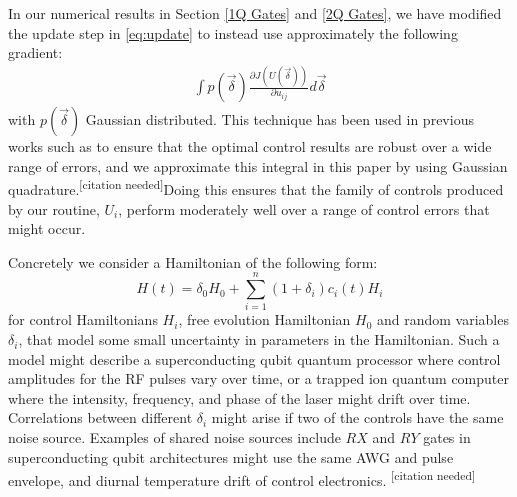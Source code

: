\documentclass[aps,nofootinbib,pra,notitlepage,twocolumn]{revtex4-1}
\newcommand{\needcite}{{\color{blue}\textsuperscript{[citation needed]}}}
\begin{document}
In our numerical results in Section \ref{1Q Gates} and \ref{2Q Gates}, we have modified the update step in \ref{eq:update} to instead use approximately the following gradient:
\begin{align}\label{quadrature}
\int p(\vec{\delta})\frac{\partial J(U(\vec{\delta}))}{\partial u_{ij}} d\vec{\delta}
\end{align}
with $p(\vec{\delta})$ Gaussian distributed. This technique has been used in previous works such as \cite{Goerz2014} to ensure that the optimal control results are robust over a wide range of errors, and we approximate this integral in this paper by using Gaussian quadrature.\needcite Doing this ensures that the family of controls produced by our routine, $U_i$, perform moderately well over a range of control errors that might occur.

Concretely we consider a Hamiltonian of the following form:
\begin{equation}\label{eq:2}
  H(t) = \delta_0H_0 + \sum_{i=1}^n (1 + \delta_i)c_i(t)H_i
\end{equation}
for control Hamiltonians $H_i$, free evolution Hamiltonian $H_0$ and random variables $\delta_i$, that model some small uncertainty in parameters in the Hamiltonian. Such a model might describe a superconducting qubit quantum processor where control amplitudes for the RF pulses vary over time, or a trapped ion quantum computer where the intensity, frequency, and phase of the laser might drift over time.\cite{Lekitsch2017} Correlations between different $\delta_i$ might arise if two of the controls have the same noise source. Examples of shared noise sources include $RX$ and $RY$ gates in superconducting qubit architectures might use the same AWG and pulse envelope, and diurnal temperature drift of control electronics. \needcite
\end{document}
